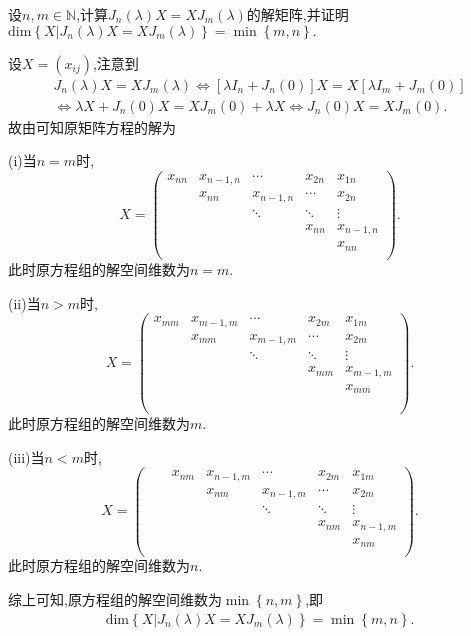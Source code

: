 \documentclass[../../main.tex]{subfiles}
\begin{document}
\begin{corollary}\label{corollary:与Jordan块J_n(lambda)可交换的矩阵}
设$n,m\in\mathbb{N}$,计算$J_n(\lambda)X = XJ_m(\lambda)$的解矩阵,并证明$\mathrm{dim}\left\{ X|J_n\left( \lambda \right) X=XJ_m\left( \lambda \right) \right\} =\min \left\{ m,n \right\}.$
\end{corollary}
\begin{solution}
设$X=(x_{ij})$,注意到
\begin{gather*}
J_n\left( \lambda \right) X=XJ_m\left( \lambda \right) \Longleftrightarrow \left[ \lambda I_n+J_n\left( 0 \right) \right] X=X\left[ \lambda I_m+J_m\left( 0 \right) \right] 
\\
\Longleftrightarrow \lambda X+J_n\left( 0 \right) X=XJ_m\left( 0 \right) +\lambda X\Longleftrightarrow J_n\left( 0 \right) X=XJ_m\left( 0 \right) .
\end{gather*}
故由可知原矩阵方程的解为

(i)当$n=m$时,
\[
X=\left( \begin{matrix}
x_{nn}&		x_{n-1,n}&		\cdots&		x_{2n}&		x_{1n}\\
&		x_{nn}&		x_{n-1,n}&		\cdots&		x_{2n}\\
&		&		\ddots&		\ddots&		\vdots\\
&		&		&		x_{nn}&		x_{n-1,n}\\
&		&		&		&		x_{nn}\\
\end{matrix} \right) .
\] 
此时原方程组的解空间维数为$n=m$.

(ii)当$n>m$时,
\[
X=\left( \begin{matrix}
x_{mm}&		x_{m-1,m}&		\cdots&		x_{2m}&		x_{1m}\\
&		x_{mm}&		x_{m-1,m}&		\cdots&		x_{2m}\\
&		&		\ddots&		\ddots&		\vdots\\
&		&		&		x_{mm}&		x_{m-1,m}\\
&		&		&		&		x_{mm}\\
&		&		&		&		\\
&		&		&		&		\\
\end{matrix} \right) .
\] 
此时原方程组的解空间维数为$m$.

(iii)当$n<m$时,
\[
X=\left( \begin{matrix}
	&		&		x_{nm}&		x_{n-1,m}&		\cdots&		x_{2m}&		x_{1m}\\
	&		&		&		x_{nm}&		x_{n-1,m}&		\cdots&		x_{2m}\\
	&		&		&		&		\ddots&		\ddots&		\vdots\\
	&		&		&		&		&		x_{nm}&		x_{n-1,m}\\
	&		&		&		&		&		&		x_{nm}\\
\end{matrix} \right) .
\] 
此时原方程组的解空间维数为$n $.

综上可知,原方程组的解空间维数为$\min \left\{ n,m \right\} $,即
\begin{align*}
\mathrm{dim}\left\{ X|J_n\left( \lambda \right) X=XJ_m\left( \lambda \right) \right\} =\min \left\{ m,n \right\}.
\end{align*}

\end{solution}
\end{document}
